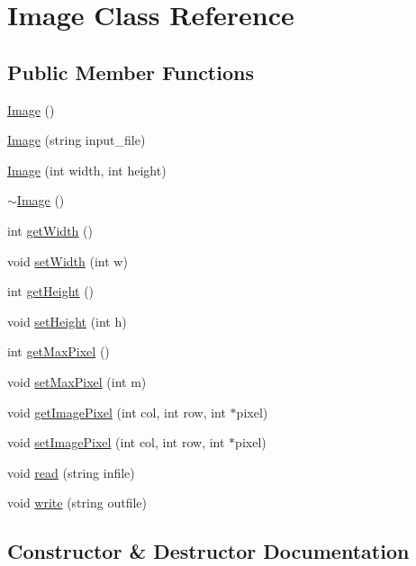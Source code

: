 \hypertarget{class_image}{}\section{Image Class Reference}
\label{class_image}
\subsection*{Public Member Functions}
\begin{DoxyCompactItemize}
\item 
\hyperlink{class_image_a58edd1c45b4faeb5f789b0d036d02313}{Image} ()
\item 
\hyperlink{class_image_af2d2b2b46060ce7d4dda966d1bb29b45}{Image} (string input\+\_\+file)
\item 
\hyperlink{class_image_afb0339b802ed560e69eb07358d30198f}{Image} (int width, int height)
\item 
\hyperlink{class_image_a0294f63700543e11c0f0da85601c7ae5}{$\sim$\+Image} ()
\item 
int \hyperlink{class_image_af2720a072812763395512fc3c8c21362}{get\+Width} ()
\item 
void \hyperlink{class_image_a385abd0ecca8787fe15d9a72ac60001a}{set\+Width} (int w)
\item 
int \hyperlink{class_image_aa4e1f064e5e1f3f04ad605408f1ec3af}{get\+Height} ()
\item 
void \hyperlink{class_image_a6e15783dcc55c301f4e887e27a7c38be}{set\+Height} (int h)
\item 
int \hyperlink{class_image_a4fc6fccb6a5cdb33dd2ee14d6d785075}{get\+Max\+Pixel} ()
\item 
void \hyperlink{class_image_a726a71590bc574158cb5d4994c4b12d1}{set\+Max\+Pixel} (int m)
\item 
void \hyperlink{class_image_a06bf6921136ef94ef30a788dbf609ce9}{get\+Image\+Pixel} (int col, int row, int $\ast$pixel)
\item 
void \hyperlink{class_image_a44556ed55401215428fbaae43256315c}{set\+Image\+Pixel} (int col, int row, int $\ast$pixel)
\item 
void \hyperlink{class_image_afd7841c2016dc76156a43cc4cd348680}{read} (string infile)
\item 
void \hyperlink{class_image_addd74434babf60a45c1d7b9fc155723a}{write} (string outfile)
\end{DoxyCompactItemize}


\subsection{Constructor \& Destructor Documentation}
\mbox{\label{class_image_a58edd1c45b4faeb5f789b0d036d02313}} 
